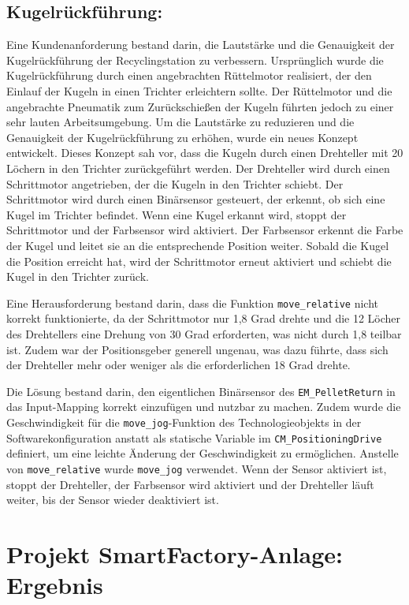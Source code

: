 \subsection{Kugelrückführung:}
Eine Kundenanforderung bestand darin, die Lautstärke und die Genauigkeit der Kugelrückführung der Recyclingstation zu verbessern. Ursprünglich wurde die Kugelrückführung durch einen angebrachten Rüttelmotor realisiert, der den Einlauf der Kugeln in einen Trichter erleichtern sollte. Der Rüttelmotor und die angebrachte Pneumatik zum Zurückschießen der Kugeln führten jedoch zu einer sehr lauten Arbeitsumgebung. Um die Lautstärke zu reduzieren und die Genauigkeit der Kugelrückführung zu erhöhen, wurde ein neues Konzept entwickelt. Dieses Konzept sah vor, dass die Kugeln durch einen Drehteller mit 20 Löchern in den Trichter zurückgeführt werden. Der Drehteller wird durch einen Schrittmotor angetrieben, der die Kugeln in den Trichter schiebt. Der Schrittmotor wird durch einen Binärsensor gesteuert, der erkennt, ob sich eine Kugel im Trichter befindet. Wenn eine Kugel erkannt wird, stoppt der Schrittmotor und der Farbsensor wird aktiviert. Der Farbsensor erkennt die Farbe der Kugel und leitet sie an die entsprechende Position weiter. Sobald die Kugel die Position erreicht hat, wird der Schrittmotor erneut aktiviert und schiebt die Kugel in den Trichter zurück.

Eine Herausforderung bestand darin, dass die Funktion \texttt{move\_relative} nicht korrekt funktionierte, da der Schrittmotor nur 1,8 Grad drehte und die 12 Löcher des Drehtellers eine Drehung von 30 Grad erforderten, was nicht durch 1,8 teilbar ist. Zudem war der Positionsgeber generell ungenau, was dazu führte, dass sich der Drehteller mehr oder weniger als die erforderlichen 18 Grad drehte.

Die Lösung bestand darin, den eigentlichen Binärsensor des \texttt{EM\_PelletReturn} in das Input-Mapping korrekt einzufügen und nutzbar zu machen. Zudem wurde die Geschwindigkeit für die \texttt{move\_jog}-Funktion des Technologieobjekts in der Softwarekonfiguration anstatt als statische Variable im \texttt{CM\_PositioningDrive} definiert, um eine leichte Änderung der Geschwindigkeit zu ermöglichen. Anstelle von \texttt{move\_relative} wurde \texttt{move\_jog} verwendet. Wenn der Sensor aktiviert ist, stoppt der Drehteller, der Farbsensor wird aktiviert und der Drehteller läuft weiter, bis der Sensor wieder deaktiviert ist.

\section{Projekt SmartFactory-Anlage: Ergebnis}\label{sec:Projekt_SmartFactory-Anlage:_Ergebnis}

